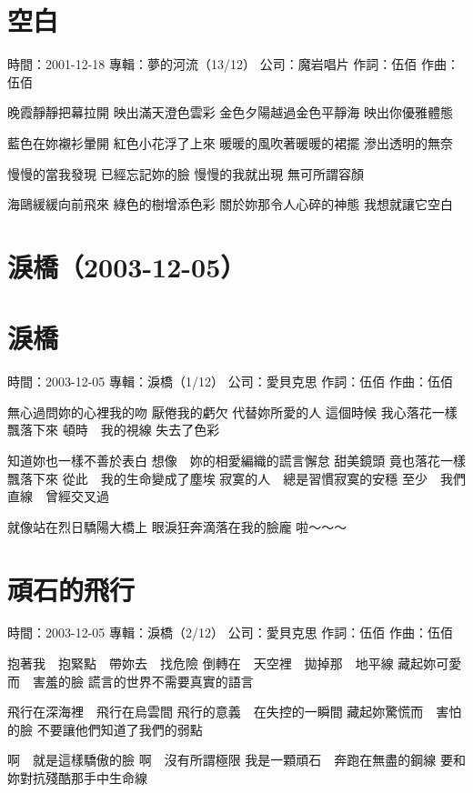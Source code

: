 \documentclass[UTF8,a4paper,oneside,twocolumn,12pt]{ctexbook}
\newcommand{\infopair}[2]{\textbullet #1：#2}
\newcommand{\zc}[1][伍佰]{\infopair{作詞}{#1}}
\newcommand{\zq}[1][伍佰]{\infopair{作曲}{#1}}
\newcommand{\zj}[1]{\infopair{專輯}{#1}}
\newcommand{\sj}[1]{\infopair{時間}{#1}}
\newcommand{\gs}[1]{\infopair{公司}{#1}}
\newenvironment{info}{\begin{flushleft}\kaishu
	}
	{\end{flushleft}\normalsize\yahei\par}
\newenvironment{lyric}{
	}
{}
\begin{document}
\section{空白}
\begin{info}
	\sj{2001-12-18}
	\zj{夢的河流（13/12）}
	\gs{魔岩唱片}
	\zc
	\zq
\end{info}
\begin{lyric}
	晚霞靜靜把幕拉開
	映出滿天澄色雲彩
	金色夕陽越過金色平靜海
	映出你優雅體態

	藍色在妳襯衫暈開
	紅色小花浮了上來
	暖暖的風吹著暖暖的裙擺
	滲出透明的無奈

	慢慢的當我發現
	已經忘記妳的臉
	慢慢的我就出現
	無可所謂容顏

	海鷗緩緩向前飛來
	綠色的樹增添色彩
	關於妳那令人心碎的神態
	我想就讓它空白
\end{lyric}

\section*{淚橋（2003-12-05）}
\section{淚橋}
\begin{info}
	\sj{2003-12-05}
	\zj{淚橋（1/12）}
	\gs{愛貝克思}
	\zc
	\zq
\end{info}
\begin{lyric}
	無心過問妳的心裡我的吻
	厭倦我的虧欠 代替妳所愛的人
	這個時候
	我心落花一樣飄落下來
	頓時　我的視線
	失去了色彩

	知道妳也一樣不善於表白
	想像　妳的相愛編織的謊言懈怠
	甜美鏡頭
	竟也落花一樣飄落下來
	從此　我的生命變成了塵埃
	寂寞的人　總是習慣寂寞的安穩
	至少　我們直線　曾經交叉過

	就像站在烈日驕陽大橋上
	眼淚狂奔滴落在我的臉龐
	啦～～～
\end{lyric}

\section{頑石的飛行}
\begin{info}
	\sj{2003-12-05}
	\zj{淚橋（2/12）}
	\gs{愛貝克思}
	\zc
	\zq
\end{info}
\begin{lyric}
	抱著我　抱緊點　帶妳去　找危險
	倒轉在　天空裡　拋掉那　地平線
	藏起妳可愛而　害羞的臉
	謊言的世界不需要真實的語言

	飛行在深海裡　飛行在烏雲間
	飛行的意義　在失控的一瞬間
	藏起妳驚慌而　害怕的臉
	不要讓他們知道了我們的弱點

	啊　就是這樣驕傲的臉
	啊　沒有所謂極限
	我是一顆頑石　奔跑在無盡的鋼線
	要和妳對抗殘酷那手中生命線
\end{lyric}
\end{document}
